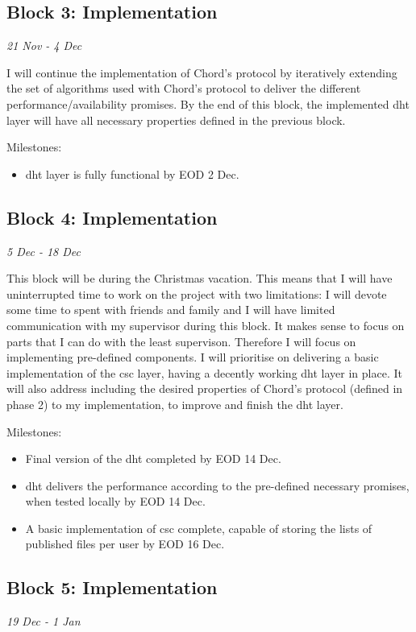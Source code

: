 \documentclass[12pt]{article}
\begin{document}
\subsection{Block 3: Implementation}
\emph{21 Nov - 4 Dec}  %

I will continue the implementation of Chord's protocol by iteratively extending the set of algorithms used with Chord's protocol to deliver the different performance/availability promises. By the end of this block, the implemented \gls{dht} layer will have all necessary properties defined in the previous block.

Milestones:
\begin{itemize}
\item{\gls{dht} layer is fully functional by EOD 2 Dec.}
\end{itemize}

\subsection{Block 4: Implementation}
\emph{5 Dec - 18 Dec}  %

This block will be during the Christmas vacation. This means that I will have uninterrupted time to work on the project with two limitations: I will devote some time to spent with friends and family and I will have limited communication with my supervisor during this block. It makes sense to focus on parts that I can do with the least supervison. Therefore I will focus on implementing pre-defined components. I will prioritise on delivering a basic implementation of the \gls{csc} layer, having a decently working \gls{dht} layer in place. It will also address including the desired properties of Chord's protocol (defined in phase 2) to my implementation, to improve and finish the \gls{dht} layer.

Milestones:
\begin{itemize}
\item{Final version of the \gls{dht} completed by EOD 14 Dec.}
\item{\gls{dht} delivers the performance according to the pre-defined necessary promises, when tested locally by EOD 14 Dec.}
\item{A basic implementation of \gls{csc} complete, capable of storing the lists of published files per user by EOD 16 Dec.}
\end{itemize}

\subsection{Block 5: Implementation}
\emph{19 Dec - 1 Jan}  %
\end{document}
